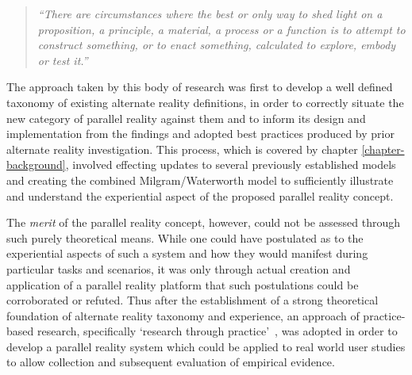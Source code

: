 \begin{quote}
	\textit{``There are circumstances where the best or only way to shed light on a proposition, a principle, a material, a process or a function is to attempt to construct something, or to enact something, calculated to explore, embody or test it.''}~\cite{Archer1995}
\end{quote}


The approach taken by this body of research was first to develop a well defined taxonomy of existing alternate reality definitions, in order to correctly situate the new category of parallel reality against them and to inform its design and implementation from the findings and adopted best practices produced by prior alternate reality investigation. This process, which is covered by chapter \ref{chapter-background}, involved effecting updates to several previously established models and creating the combined Milgram/Waterworth model to sufficiently illustrate and understand the experiential aspect of the proposed parallel reality concept.

The \textit{merit} of the parallel reality concept, however, could not be assessed through such purely theoretical means. While one could have postulated as to the experiential aspects of such a system and how they would manifest during particular tasks and scenarios, it was only through actual creation and application of a parallel reality platform that such postulations could be corroborated or refuted. Thus after the establishment of a strong theoretical foundation of alternate reality taxonomy and experience, an approach of practice-based research, specifically `research through practice'~\cite{Chynoweth2014}, was adopted in order to develop a parallel reality system which could be applied to real world user studies to allow collection and subsequent evaluation of empirical evidence.

